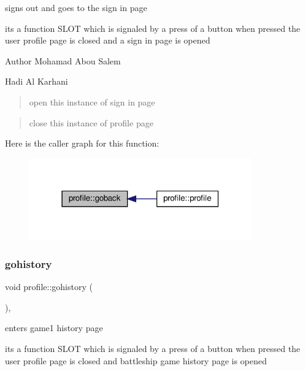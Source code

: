 signs out and goes to the sign in page 

its a function S\+L\+OT which is signaled by a press of a button when pressed the user profile page is closed and a sign in page is opened

\begin{DoxyAuthor}{Author}
Mohamad Abou Salem 

Hadi Al Karhani 
\end{DoxyAuthor}
\begin{quote}
open this instance of sign in page \end{quote}


\begin{quote}
close this instance of profile page \end{quote}
Here is the caller graph for this function\+:
\nopagebreak
\begin{figure}[H]
\begin{center}
\leavevmode
\includegraphics[width=271pt]{classprofile_a0ba746f5f77f499dfc9ef25d0a6e88e2_icgraph}
\end{center}
\end{figure}
\mbox{\label{classprofile_a7b83e5727f3cc2e1fcfd8ff6883681d9}} 
\subsubsection{\texorpdfstring{gohistory}{gohistory}}
{\footnotesize\ttfamily void profile\+::gohistory (\begin{DoxyParamCaption}{ }\end{DoxyParamCaption})\hspace{0.3cm}{\ttfamily [private]}, {\ttfamily [slot]}}



enters game1 history page 

its a function S\+L\+OT which is signaled by a press of a button when pressed the user profile page is closed and battleship game history page is opened

